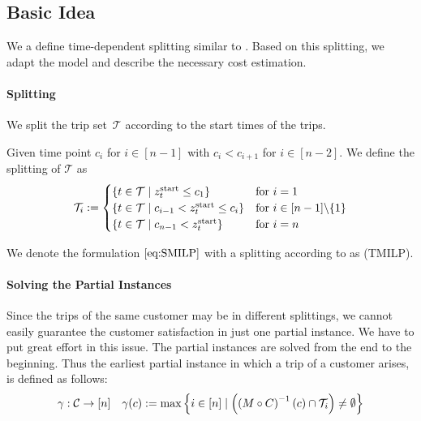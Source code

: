 \subsection{Basic Idea}
\label{sec:basic_idea}

We a define time-dependent splitting similar to \cite{Knoll}. Based on this splitting, we adapt the model and describe the necessary cost estimation.

\paragraph{Splitting} \parfill

We split the trip set~$\mathcal{T}$ according to the start times of the trips.

\begin{definition}
\label{def:time_dependent_splitting}

Given time point $c_i$ for $i\in[n-1]$ with $c_i<c_{i+1}$ for $i\in[n-2]$. We define the splitting of $\mathcal{T}$ as
\begin{align*}
	\mathcal{T}_i := \begin{cases}
		\left\{t\in\mathcal{T}\mid z^{\operatorname{start}}_t\leq c_1\right\} & \text{for } i=1 \\
		\left\{t\in\mathcal{T}\mid c_{i-1}<z^{\operatorname{start}}_t\leq c_i\right\} & \text{for } i\in[n-1]\backslash\{1\} \\
		\left\{t\in\mathcal{T}\mid c_{n-1}<z^{\operatorname{start}}_t\right\} & \text{for } i=n
	\end{cases}
\end{align*}

\end{definition}

We denote the formulation $\eqref{eq:SMILP}$ with a splitting according to  as (TMILP).

\paragraph{Solving the Partial Instances} \parfill

Since the trips of the same customer may be in different splittings, we cannot easily guarantee the customer satisfaction in just one partial instance. We have to put great effort in this issue. The partial instances are solved from the end to the beginning. Thus the earliest partial instance in which a trip of a customer arises, is defined as follows:
\begin{align*}
	\gamma: \mathcal{C}\to[n] && \gamma(c) := \max\left\{i\in[n]\mid\left(\left(M\circ C\right)^{-1}(c)\cap\mathcal{T}_i\right)\neq\emptyset\right\}
\end{align*}

